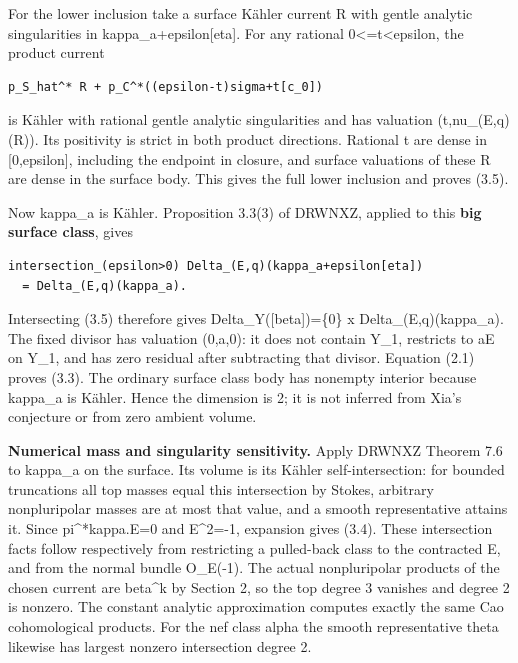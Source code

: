 \documentclass[11pt]{article}
\begin{document}
For the lower inclusion take a surface Kähler current R with gentle analytic singularities in kappa\_\allowbreak{}a+epsilon[eta]. For any rational 0<=\allowbreak{}t<epsilon, the product current

\begin{Verbatim}[breaklines=true,fontsize=\small]
p_S_hat^* R + p_C^*((epsilon-t)sigma+t[c_0])
\end{Verbatim}

is Kähler with rational gentle analytic singularities and has valuation (t,nu\_\allowbreak{}(E,q)(R)). Its positivity is strict in both product directions. Rational t are dense in [0,epsilon], including the endpoint in closure, and surface valuations of these R are dense in the surface body. This gives the full lower inclusion and proves (3.5).

Now kappa\_\allowbreak{}a is Kähler. Proposition 3.3(3) of DRWNXZ, applied to this \textbf{big surface class}, gives

\begin{Verbatim}[breaklines=true,fontsize=\small]
intersection_(epsilon>0) Delta_(E,q)(kappa_a+epsilon[eta])
  = Delta_(E,q)(kappa_a).
\end{Verbatim}

Intersecting (3.5) therefore gives Delta\_\allowbreak{}Y([beta])=\allowbreak{}\{0\} x Delta\_\allowbreak{}(E,q)(kappa\_\allowbreak{}a). The fixed divisor has valuation (0,a,0): it does not contain Y\_\allowbreak{}1, restricts to aE on Y\_\allowbreak{}1, and has zero residual after subtracting that divisor. Equation (2.1) proves (3.3). The ordinary surface class body has nonempty interior because kappa\_\allowbreak{}a is Kähler. Hence the dimension is 2; it is not inferred from Xia's conjecture or from zero ambient volume.

\textbf{Numerical mass and singularity sensitivity.} Apply DRWNXZ Theorem 7.6 to kappa\_\allowbreak{}a on the surface. Its volume is its Kähler self-\allowbreak{}intersection: for bounded truncations all top masses equal this intersection by Stokes, arbitrary nonpluripolar masses are at most that value, and a smooth representative attains it. Since pi\textasciicircum{}\allowbreak{}*kappa.E=\allowbreak{}0 and E\textasciicircum{}\allowbreak{}2=\allowbreak{}-\allowbreak{}1, expansion gives (3.4). These intersection facts follow respectively from restricting a pulled-\allowbreak{}back class to the contracted E, and from the normal bundle O\_\allowbreak{}E(-\allowbreak{}1). The actual nonpluripolar products of the chosen current are beta\textasciicircum{}\allowbreak{}k by Section 2, so the top degree 3 vanishes and degree 2 is nonzero. The constant analytic approximation computes exactly the same Cao cohomological products. For the nef class alpha the smooth representative theta likewise has largest nonzero intersection degree 2.
\end{document}
